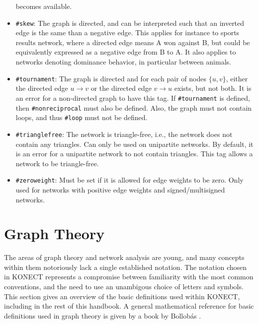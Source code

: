 \documentclass{article}
\begin{document}
\begin{itemize}
  becomes available.
\item \texttt{\#skew}:  The graph is directed,
  and can be interpreted such that an inverted edge is the same than a
  negative edge.  This applies for instance to sports results network,
  where a directed edge means A won against B, but could be equivalently
  expressed as a negative edge from B to A.  It also applies to networks
  denoting dominance behavior, in particular between animals. 
\item \texttt{\#tournament}:  The graph is directed and for each
  pair of nodes $\{u,v\}$, either the directed edge $u \rightarrow v$ or
  the directed edge $v \rightarrow u$ exists, but not both.  It
  is an error for a non-directed graph to have this tag.  If
  \texttt{\#tournament} is defined, then
  \texttt{\#nonreciprocal} must also be defined.  Also, the graph must
  not contain loops, and thus
  \texttt{\#loop} must not be defined. 
\item \texttt{\#trianglefree}:  The network is triangle-free, i.e., the
  network does not contain any triangles.  Can only be used on
  unipartite networks.  By default, it is an error for a unipartite
  network to not contain triangles.  This tag allows a network to be
  triangle-free. 
\item \texttt{\#zeroweight}:  Must be set if it is allowed for edge
  weights to be zero. Only used for networks with positive edge
  weights and signed/multisigned networks. 
\end{itemize}

\section{Graph Theory}
\label{sec:definitions}
The areas of graph theory and network analysis are young, and
many concepts within them notoriously lack a single established notation.  The
notation chosen in KONECT represents a compromise between familiarity
with the most common conventions, and the need to use an unambigous
choice of letters and symbols.  This section gives an overview of the
basic definitions used within KONECT, including in the rest of this handbook. 
A general mathematical reference for basic definitions used in graph
theory is given by a book by Bollobás \citeyearpar{b116}.  
\end{document}
